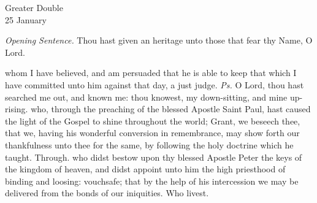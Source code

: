 \begin{inhead}
    {Greater Double\\
25 January}
\end{inhead}
\par\noindent
\textit{Opening Sentence.} Thou hast given an heritage unto those that fear thy Name, O Lord.%



\introit
{} whom I have believed, and am persuaded that he is able to keep that which I have committed unto him against that day, a just judge. \textit{Ps.} O Lord, thou hast searched me out, and known me: thou knowest, my down-sitting, and mine up-rising.
\collect
{} who, through the preaching of the blessed Apostle Saint Paul, hast caused the light of the Gospel to shine throughout the world; Grant, we beseech thee, that we, having his wonderful conversion in remembrance, may show forth our thankfulness unto thee for the same, by following the holy doctrine which he taught. Through.
 who didst bestow upon thy blessed Apostle Peter the keys of the kingdom of heaven, and didst appoint unto him the high priesthood of binding and loosing: vouchsafe; that by the help of his intercession we may be delivered from the bonds of our iniquities. Who livest.

